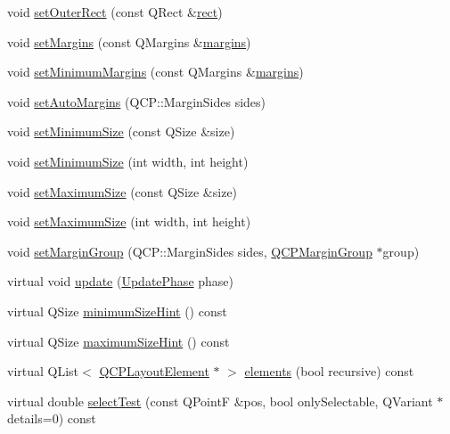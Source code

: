 \begin{DoxyCompactItemize}
\item 
void \hyperlink{class_q_c_p_layout_element_a38975ea13e36de8e53391ce41d94bc0f}{set\+Outer\+Rect} (const Q\+Rect \&\hyperlink{class_q_c_p_layout_element_affdfea003469aac3d0fac5f4e06171bc}{rect})
\item 
void \hyperlink{class_q_c_p_layout_element_a8f450b1f3f992ad576fce2c63d8b79cf}{set\+Margins} (const Q\+Margins \&\hyperlink{class_q_c_p_layout_element_a85ff977dfcced84eef32d9f819ec9543}{margins})
\item 
void \hyperlink{class_q_c_p_layout_element_a0a8a17abc16b7923159fcc7608f94673}{set\+Minimum\+Margins} (const Q\+Margins \&\hyperlink{class_q_c_p_layout_element_a85ff977dfcced84eef32d9f819ec9543}{margins})
\item 
void \hyperlink{class_q_c_p_layout_element_accfda49994e3e6d51ed14504abf9d27d}{set\+Auto\+Margins} (Q\+C\+P\+::\+Margin\+Sides sides)
\item 
void \hyperlink{class_q_c_p_layout_element_a5dd29a3c8bc88440c97c06b67be7886b}{set\+Minimum\+Size} (const Q\+Size \&size)
\item 
void \hyperlink{class_q_c_p_layout_element_a8e0447614a0bf92de9a7304588c6b96e}{set\+Minimum\+Size} (int width, int height)
\item 
void \hyperlink{class_q_c_p_layout_element_a74eb5280a737ab44833d506db65efd95}{set\+Maximum\+Size} (const Q\+Size \&size)
\item 
void \hyperlink{class_q_c_p_layout_element_a03e0e9c48f230217c529b0819f832d84}{set\+Maximum\+Size} (int width, int height)
\item 
void \hyperlink{class_q_c_p_layout_element_a516e56f76b6bc100e8e71d329866847d}{set\+Margin\+Group} (Q\+C\+P\+::\+Margin\+Sides sides, \hyperlink{class_q_c_p_margin_group}{Q\+C\+P\+Margin\+Group} $\ast$group)
\item 
virtual void \hyperlink{class_q_c_p_layout_element_a929c2ec62e0e0e1d8418eaa802e2af9b}{update} (\hyperlink{class_q_c_p_layout_element_a0d83360e05735735aaf6d7983c56374d}{Update\+Phase} phase)
\item 
virtual Q\+Size \hyperlink{class_q_c_p_layout_element_aebe14fb71f858c0f98caf8d342a9864a}{minimum\+Size\+Hint} () const 
\item 
virtual Q\+Size \hyperlink{class_q_c_p_layout_element_adbd3a00fec44c977150c6be7329eb801}{maximum\+Size\+Hint} () const 
\item 
virtual Q\+List$<$ \hyperlink{class_q_c_p_layout_element}{Q\+C\+P\+Layout\+Element} $\ast$ $>$ \hyperlink{class_q_c_p_layout_element_a311d60d78e62ef8eaaedb1b6ceb9e788}{elements} (bool recursive) const 
\item 
virtual double \hyperlink{class_q_c_p_layout_element_a9fcf5d0ea19f2c23b2b528bce2c6f095}{select\+Test} (const Q\+Point\+F \&pos, bool only\+Selectable, Q\+Variant $\ast$details=0) const 
\end{DoxyCompactItemize}
